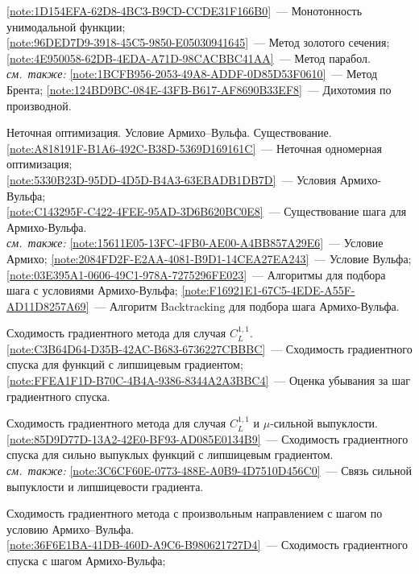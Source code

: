 \begin{description}[font=\normalfont\bfseries]
  \cref{note:1D154EFA-62D8-4BC3-B9CD-CCDE31F166B0}~--- Монотонность унимодальной функции;\\
  \cref{note:96DED7D9-3918-45C5-9850-E05030941645}~--- Метод золотого сечения;\\
  \cref{note:4E950058-62DB-4EDA-A71D-98CACBBC41AA}~--- Метод парабол.\\
  \emph{см.\ также:} \cref{note:1BCFB956-2053-49A8-ADDF-0D85D53F0610}~--- Метод Брента; \cref{note:124BD9BC-084E-43FB-B617-AF8690B33EF8}~--- Дихотомия по производной.
\item[Т12.] Неточная оптимизация. Условие Армихо--Вульфа. Существование.\\
  \cref{note:A818191F-B1A6-492C-B38D-5369D169161C}~--- Неточная одномерная оптимизация;\\
  \cref{note:5330B23D-95DD-4D5D-B4A3-63EBADB1DB7D}~--- Условия Армихо-Вульфа;\\
  \cref{note:C143295F-C422-4FEE-95AD-3D6B620BC0E8}~--- Существование шага для Армихо-Вульфа.\\
  \emph{см.\ также:} \cref{note:15611E05-13FC-4FB0-AE00-A4BB857A29E6}~--- Условие Армихо; \cref{note:2084FD2F-E2AA-4081-B9D1-14CEA27EA243}~--- Условие Вульфа; \cref{note:03E395A1-0606-49C1-978A-7275296FE023}~--- Алгоритмы для подбора шага с условиями Армихо-Вульфа; \cref{note:F16921E1-67C5-4EDE-A55F-AD11D8257A69}~--- Алгоритм Backtracking для подбора шага Армихо-Вульфа.
\item[Т13.] Сходимость градиентного метода для случая $C^{1,1}_L$.\\
  \cref{note:C3B64D64-D35B-42AC-B683-6736227CBBBC}~--- Сходимость градиентного спуска для функций с липшицевым градиентом;\\
  \cref{note:FFEA1F1D-B70C-4B4A-9386-8344A2A3BBC4}~--- Оценка убывания за шаг градиентного спуска.
\item[Т14.] Сходимость градиентного метода для случая $C^{1,1}_L$ и $\mu$-сильной выпуклости.\\
  \cref{note:85D9D77D-13A2-42E0-BF93-AD085E0134B9}~--- Сходимость градиентного спуска для сильно выпуклых функций с липшицевым градиентом.\\
  \emph{см.\ также:} \cref{note:3C6CF60E-0773-488E-A0B9-4D7510D456C0}~--- Связь сильной выпуклости и липшицевости градиента.
\item[Т15.] Сходимость градиентного метода с произвольным направлением с шагом по условию Армихо--Вульфа.\\
  \cref{note:36F6E1BA-41DB-460D-A9C6-B980621727D4}~--- Сходимость градиентного спуска с шагом Армихо-Вульфа;\\

\end{description}
